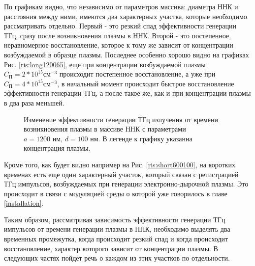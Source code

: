 \documentclass[a4paper,14pt,russian]{extreport}
\begin{document}
				По графикам видно, что независимо от параметров массива: диаметра ННК и расстояния между ними, имеются два характерных участка, которые необходимо рассматривать отдельно. Первый - это резкий спад эффективности генерации ТГц, сразу после возникновения плазмы в ННК. Второй - это постепенное, неравномерное восстановление, которое к тому же зависит от концентрации возбуждаемой в образце плазмы. Последнее особенно хорошо видно на графиках Рис. \ref{ris:long120065}, еще при концентрации возбуждаемой плазмы $C_{\text{П}} = 2*10^{15} \text{см}^{-3}$ происходит постепенное восстановление, а уже при $C_{\text{П}} = 4*10^{15} \text{см}^{-3}$, в начальный момент происходит быстрое восстановление эффективности генерации ТГц, а после такое же, как и при концентрации плазмы в два раза меньшей.\par
				\begin{figure}[h!]
					\caption{Изменение эффективности генерации ТГц излучения от времени возникновения плазмы в массиве ННК с параметрами $a = 1200 \text{ нм, } d = 100 \text{ нм}$. В легенде к графику указанна концентрация плазмы.}
				\label{ris:long1200100}
				\end{figure}
				Кроме того, как будет видно например на Рис. \ref{ris:short600100}, на коротких временах есть еще один характерный участок, который связан с регистрацией ТГц импульсов, возбуждаемых при генерации электронно-дырочной плазмы. Это происходит в связи с модуляцией среды о которой уже говорилось в главе \ref{installation}. \par
				Таким образом, рассматривая зависимость эффективности генерации ТГц импульсов от времени генерации плазмы в ННК, необходимо выделять два временных промежутка, когда происходит резкий спад и когда происходит восстановление, характер которого зависит от концентрации плазмы. В следующих частях пойдет речь о каждом из этих участков по отдельности.
\end{document}
